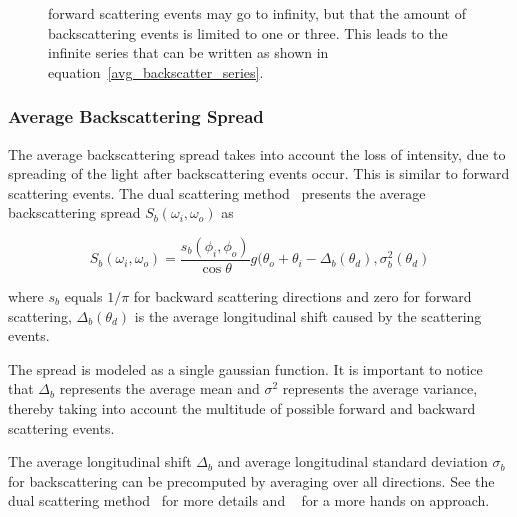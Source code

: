 \begin{figure}
{    forward scattering events may go to infinity, but that the amount of backscattering events is limited to one or three. This leads to the infinite series that can be written as shown in equation~\ref{avg_backscatter_series}.}
    \label{avg_backscatter_attenuation}
\end{figure}

\subsubsection{Average Backscattering Spread}

The average backscattering spread takes into account the loss of intensity, due to spreading of the light after backscattering events occur. This is similar to forward scattering events. The dual scattering method~\cite{zinke} presents the average backscattering spread $S_b(\omega_i, \omega_o)$ as

\begin{equation}
S_b(\omega_i, \omega_o) = \frac{s_b(\phi_i, \phi_o)}{\cos \theta} g(\theta_o + \theta_i - \Delta_b(\theta_d), \sigma_b^2(\theta_d)
\end{equation}

where $s_b$ equals $1/\pi$ for backward scattering directions and zero for forward scattering, $\Delta_b(\theta_d)$ is the average longitudinal shift caused by the scattering events.

The spread is modeled as a single gaussian function. It is important to notice that $\Delta_b$ represents the average mean and $\sigma^2$ represents the average variance, thereby taking into account the multitude of possible forward and backward scattering events.

The average longitudinal shift $\Delta_b$ and average longitudinal standard deviation $\sigma_b$ for backscattering can be precomputed by averaging over all directions. See the dual scattering method~\cite{zinke} for more details and ~\cite{sadeghi} for a more hands on approach.







